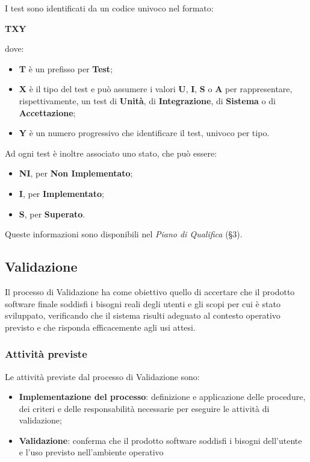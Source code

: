 \documentclass[a4paper,12pt]{article}
\begin{document}
                I test sono identificati da un codice univoco nel formato:
                \begin{center}
                    \textbf{TXY}
                \end{center}
                dove:
                \begin{itemize}
                    \item \textbf{T} è un prefisso per \textbf{Test};
                    \item \textbf{X} è il tipo del test e può assumere i valori \textbf{U}, \textbf{I}, \textbf{S} o \textbf{A} per rappresentare, rispettivamente, un test di \textbf{Unità}, di \textbf{Integrazione}, di \textbf{Sistema} o di \textbf{Accettazione};
                    \item \textbf{Y} è un numero progressivo che identificare il test, univoco per tipo.
                \end{itemize}
                Ad ogni test è inoltre associato uno stato, che può essere:
                \begin{itemize}
                    \item \textbf{NI}, per \textbf{Non Implementato};
                    \item \textbf{I}, per \textbf{Implementato};
                    \item \textbf{S}, per \textbf{Superato}.
                \end{itemize}
                Queste informazioni sono disponibili nel \textit{Piano di Qualifica} (\S3).

    \subsection{Validazione}
        Il processo di Validazione ha come obiettivo quello di accertare che il prodotto software finale soddisfi i bisogni reali degli utenti e gli scopi per cui è stato sviluppato, verificando che il sistema risulti adeguato al contesto operativo previsto e che risponda efficacemente agli usi attesi.

        \subsubsection{Attività previste}
            Le attività previste dal processo di Validazione sono:
            \begin{itemize}
                \item \textbf{Implementazione del processo}: definizione e applicazione delle procedure, dei criteri e delle responsabilità necessarie per eseguire le attività di validazione;
                \item \textbf{Validazione}: conferma che il prodotto software soddisfi i bisogni dell'utente e l'uso previsto nell'ambiente operativo
            \end{itemize}
\end{document}
